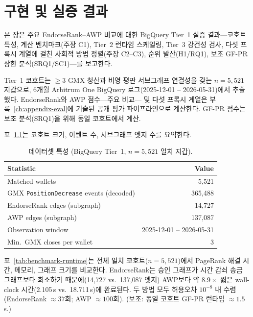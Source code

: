 
\chapter{구현 및 실증 결과}
\label{ch:results}

본 장은 주요 EndorseRank--AWP 비교에 대한 BigQuery Tier~1 실증 결과---코호트 특성, 계산 벤치마크(주장 C1), Tier~2 런타임 스케일링, Tier~3 강건성 검사, 다섯 프록시 계열에 걸친 사회적 방법 정렬(주장 C2--C3), 순위 발산(H1/RQ1), 보조 GF-PR 상한 분석(SRQ1/SC1)---를 보고한다.


Tier~1 코호트는 $\geq 3$ GMX 청산과 비영 평판 서브그래프 연결성을 갖는 $n=5{,}521$ 지갑으로, 6개월 Arbitrum One BigQuery 로그(2025-12-01 -- 2026-05-31)에서 추출했다. EndorseRank와 AWP 점수---주요 비교--- 및 다섯 프록시 계열은 부록~\ref{ch:appendix-eval}에 기술된 공개 평가 파이프라인으로 계산한다. GF-PR 점수는 보조 분석(SRQ1)을 위해 동일 코호트에서 계산.

표~\ref{tab:dataset-stats}는 코호트 크기, 이벤트 수, 서브그래프 엣지 수를 요약한다.

\begin{table}[htbp]
\centering
\caption{데이터셋 특성 (BigQuery Tier~1, $n=5{,}521$ 일치 지갑).}
\label{tab:dataset-stats}
\begin{tabular}{lr}
\toprule
Statistic & Value \\
\midrule
Matched wallets & 5{,}521 \\
GMX \texttt{PositionDecrease} events (decoded) & 365{,}488 \\
EndorseRank edges (subgraph) & 14{,}727 \\
AWP edges (subgraph) & 137{,}087 \\
Observation window & 2025-12-01 -- 2026-05-31 \\
Min.\ GMX closes per wallet & 3 \\
\bottomrule
\end{tabular}
\end{table}


표~\ref{tab:benchmark-runtime}는 전체 일치 코호트($n=5{,}521$)에서 PageRank 해결 시간, 메모리, 그래프 크기를 비교한다. EndorseRank는 승인 그래프가 시간 감쇠 송금 그래프보다 희소하기 때문에(14{,}727 vs.\ 137{,}087 엣지) AWP보다 약 $8.9\times$ 짧은 wall-clock 시간(2.105\,s vs.\ 18.711\,s)에 완료된다. 두 방법 모두 허용오차 $10^{-8}$ 내 수렴(EndorseRank $\approx 37$회; AWP $\approx 100$회). (보조: 동일 코호트 GF-PR 런타임 $\approx 1.5$\,s.)

